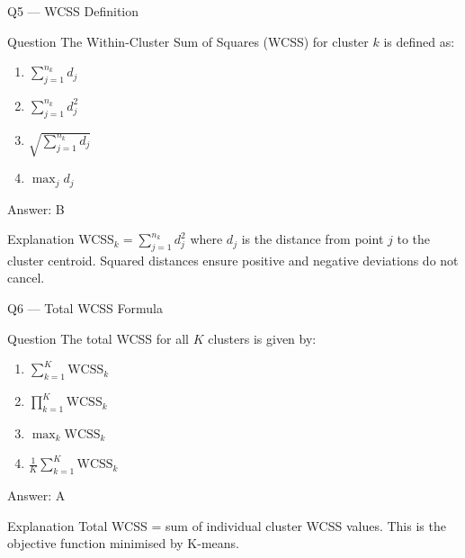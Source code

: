 \documentclass[aspectratio=169,8pt]{beamer}
\begin{document}
	\begin{frame}{Q5 --- WCSS Definition}
		\begin{block}{Question}
			The Within-Cluster Sum of Squares (WCSS) for cluster $k$ is defined as:
			\begin{enumerate}
				\item $\sum_{j=1}^{n_k} d_j$
				\item $\sum_{j=1}^{n_k} d_j^2$
				\item $\sqrt{\sum_{j=1}^{n_k} d_j}$
				\item $\max_j d_j$
			\end{enumerate}
		\end{block}
		\begin{exampleblock}{Answer: B}\end{exampleblock}
		\begin{block}{Explanation}
			WCSS$_k = \sum_{j=1}^{n_k} d_j^2$ where $d_j$ is the distance from point $j$ to the cluster centroid. Squared distances ensure positive and negative deviations do not cancel.
		\end{block}
	\end{frame}
	
	\begin{frame}{Q6 --- Total WCSS Formula}
		\begin{block}{Question}
			The total WCSS for all $K$ clusters is given by:
			\begin{enumerate}
				\item $\sum_{k=1}^{K} \text{WCSS}_k$
				\item $\prod_{k=1}^{K} \text{WCSS}_k$
				\item $\max_k \text{WCSS}_k$
				\item $\frac{1}{K} \sum_{k=1}^{K} \text{WCSS}_k$
			\end{enumerate}
		\end{block}
		\begin{exampleblock}{Answer: A}\end{exampleblock}
		\begin{block}{Explanation}
			Total WCSS = sum of individual cluster WCSS values. This is the objective function minimised by K-means.
		\end{block}
	\end{frame}
	
\end{document}
